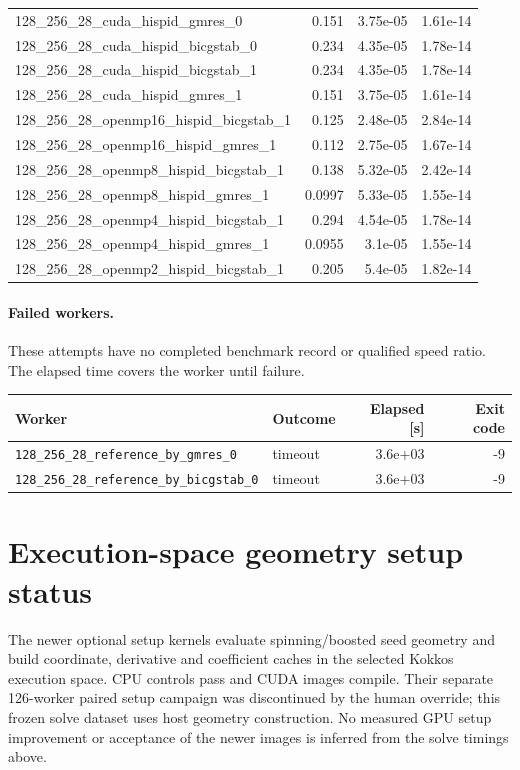 \documentclass[11pt]{article}
\begin{document}
\begin{longtable}{lrrr}
128\_256\_28\_cuda\_hispid\_gmres\_0 & 0.151 & 3.75e-05 & 1.61e-14\\
128\_256\_28\_cuda\_hispid\_bicgstab\_0 & 0.234 & 4.35e-05 & 1.78e-14\\
128\_256\_28\_cuda\_hispid\_bicgstab\_1 & 0.234 & 4.35e-05 & 1.78e-14\\
128\_256\_28\_cuda\_hispid\_gmres\_1 & 0.151 & 3.75e-05 & 1.61e-14\\
128\_256\_28\_openmp16\_hispid\_bicgstab\_1 & 0.125 & 2.48e-05 & 2.84e-14\\
128\_256\_28\_openmp16\_hispid\_gmres\_1 & 0.112 & 2.75e-05 & 1.67e-14\\
128\_256\_28\_openmp8\_hispid\_bicgstab\_1 & 0.138 & 5.32e-05 & 2.42e-14\\
128\_256\_28\_openmp8\_hispid\_gmres\_1 & 0.0997 & 5.33e-05 & 1.55e-14\\
128\_256\_28\_openmp4\_hispid\_bicgstab\_1 & 0.294 & 4.54e-05 & 1.78e-14\\
128\_256\_28\_openmp4\_hispid\_gmres\_1 & 0.0955 & 3.1e-05 & 1.55e-14\\
128\_256\_28\_openmp2\_hispid\_bicgstab\_1 & 0.205 & 5.4e-05 & 1.82e-14\\
\bottomrule\end{longtable}\normalsize
\paragraph{Failed workers.} These attempts have no completed benchmark record or qualified speed ratio. The elapsed time covers the worker until failure.
\small\begin{longtable}{llrr}\toprule Worker & Outcome & Elapsed [s] & Exit code\\\midrule\endhead
\nolinkurl{128_256_28_reference_by_gmres_0} & timeout & 3.6e+03 & -9\\
\nolinkurl{128_256_28_reference_by_bicgstab_0} & timeout & 3.6e+03 & -9\\
\bottomrule\end{longtable}\normalsize
\section{Execution-space geometry setup status}
The newer optional setup kernels evaluate spinning/boosted seed geometry and
build coordinate, derivative and coefficient caches in the selected Kokkos
execution space. CPU controls pass and CUDA images compile. Their separate
126-worker paired setup campaign was discontinued by the human override;
this frozen solve dataset uses
host geometry construction. No measured GPU setup improvement or acceptance
of the newer images is inferred from the solve timings above.
\end{document}
